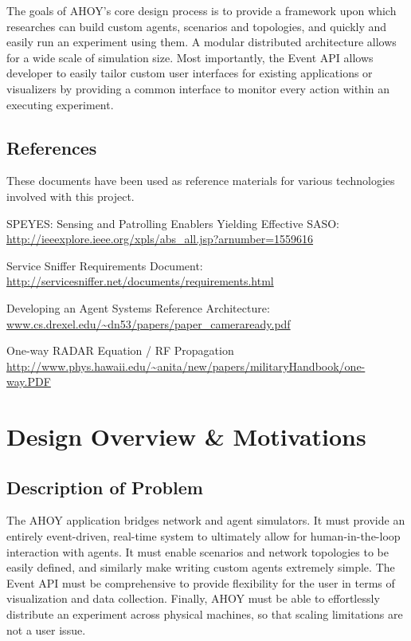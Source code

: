 \documentclass[titlepage]{article}
\renewenvironment{itemize*}
    {\begin{itemize}
        \setlength{\itemsep}{0pt}%
        \setlength{\parskip}{0pt}%
        \setlength{\partopsep}{0pt}%
        \setlength{\topsep}{0pt}}%
    {\end{itemize}}
\begin{document}
The goals of AHOY's core design process is to provide a framework upon which researches can build custom agents, scenarios and topologies, and quickly and easily run an experiment using them. A modular distributed architecture allows for a wide scale of simulation size. Most importantly, the Event API allows developer to easily tailor custom user interfaces for existing applications or visualizers by providing a common interface to monitor every action within an executing experiment.

\subsection{References%
  \label{references}%
}

These documents have been used as reference materials for various technologies involved with this project.
%
\begin{itemize*}
	\item SPEYES: Sensing and Patrolling Enablers Yielding Effective SASO: \url{http://ieeexplore.ieee.org/xpls/abs_all.jsp?arnumber=1559616}
	\item Service Sniffer Requirements Document: \url{http://servicesniffer.net/documents/requirements.html}
    \item Developing an Agent Systems Reference Architecture: \url{www.cs.drexel.edu/~dn53/papers/paper_cameraready.pdf}
    \item One-way RADAR Equation / RF Propagation \url{http://www.phys.hawaii.edu/~anita/new/papers/militaryHandbook/one-way.PDF}
\end{itemize*}

\section{Design Overview \& Motivations}
\subsection{Description of Problem}
The AHOY application bridges network and agent simulators. It must provide an entirely event-driven, real-time system to ultimately allow for human-in-the-loop interaction with agents. It must enable scenarios and network topologies to be easily defined, and similarly make writing custom agents extremely simple. The Event API must be comprehensive to provide flexibility for the user in terms of visualization and data collection. Finally, AHOY must be able to effortlessly distribute an experiment across physical machines, so that scaling limitations are not a user issue.
\end{document}
